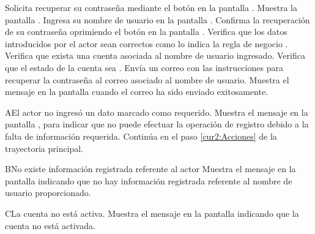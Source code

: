  \begin{UCtrayectoria}
    \UCpaso[\UCactor] Solicita recuperar su contraseña mediante el botón  en la pantalla .
    \UCpaso[\UCsist] Muestra la pantalla .
    \UCpaso[\UCactor] Ingresa su nombre de usuario en la pantalla . \label{cur2:Acciones}
    \UCpaso[\UCactor] Confirma la recuperación de su contraseña oprimiendo el botón  en la pantalla .
    \UCpaso[\UCsist] Verifica que los datos introducidos por el actor sean correctos como lo indica la regla de negocio . 
    \UCpaso[\UCsist] Verifica que exista una cuenta asociada al nombre de usuario ingresado. 
    \UCpaso[\UCsist] Verifica que el estado de la cuenta sea . 
    \UCpaso[\UCsist] Envía un correo con las instrucciones para recuperar la contraseña al correo asociado al nombre de usuario.
    \UCpaso[\UCsist] Muestra el mensaje  en la pantalla  cuando el correo ha sido enviado exitosamente.
 \end{UCtrayectoria}


 \begin{UCtrayectoriaA}{A}{El actor no ingresó un dato marcado como requerido.}
    \UCpaso[\UCsist] Muestra el mensaje  en la pantalla , para indicar que no puede efectuar la operación de registro debido a la falta de información requerida.
   \UCpaso[] Continúa en el paso \ref{cur2:Acciones} de la trayectoria principal.
 \end{UCtrayectoriaA}
 
 \begin{UCtrayectoriaA}{B}{No existe información registrada referente al actor}
    \UCpaso[\UCsist] Muestra el mensaje  en la pantalla  indicando que no hay información registrada referente al nombre de usuario proporcionado.
  \end{UCtrayectoriaA}
  
 \begin{UCtrayectoriaA}{C}{La cuenta no está activa.}
    \UCpaso[\UCsist] Muestra el mensaje  en la pantalla  indicando que la cuenta no está activada.
 \end{UCtrayectoriaA} 
  
 
